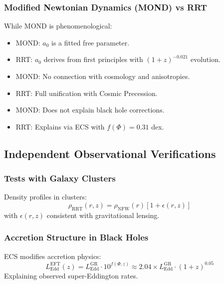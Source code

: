 \documentclass[12pt,a4paper]{article}
\begin{document}
\subsubsection{Modified Newtonian Dynamics (MOND) vs RRT}
While MOND is phenomenological:
\begin{itemize}
    \item MOND: $a_0$ is a fitted free parameter.
    \item RRT: $a_0$ derives from first principles with $(1+z)^{-0.021}$ evolution.
    \item MOND: No connection with cosmology and anisotropies.
    \item RRT: Full unification with Cosmic Precession.
    \item MOND: Does not explain black hole corrections.
    \item RRT: Explains via ECS with $f(\Phi)=0.31$ dex.
\end{itemize}

\subsection{Independent Observational Verifications}

\subsubsection{Tests with Galaxy Clusters}
Density profiles in clusters:
\begin{equation}
    \rho_{\text{RRT}}(r, z) = \rho_{\text{NFW}}(r) \left[ 1 + \epsilon(r, z) \right]
\end{equation}
with $\epsilon(r, z)$ consistent with gravitational lensing.

\subsubsection{Accretion Structure in Black Holes}
ECS modifies accretion physics:
\begin{equation}
    L^{\text{EFT}}_{\text{Edd}}(z) = L^{\text{GR}}_{\text{Edd}} \cdot 10^{f(\Phi, z)} \approx 2.04 \times L^{\text{GR}}_{\text{Edd}} \cdot (1+z)^{0.05}
\end{equation}
Explaining observed super-Eddington rates.
\end{document}
